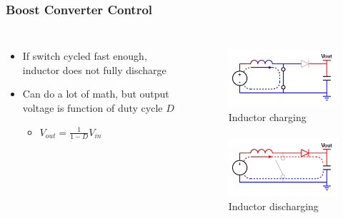 \documentclass{beamer}
\begin{document}
\begin{frame}
\frametitle{Boost Converter Control}
\begin{columns}[t]
\begin{itemize}
  \item If switch cycled fast enough, inductor does not fully discharge
  \item Can do a lot of math, but output voltage is function of duty cycle $D$
  \begin{itemize}
    \item $V_{out}=\frac{1}{1-D} V_{in}$
  \end{itemize}
\end{itemize}

\begin{figure}
  \centering
  \includegraphics[scale=0.33]{images-dis4/smps-boost-closed} \\
  Inductor charging \\
  \hfill \\
  \includegraphics[scale=0.33]{images-dis4/smps-boost-open} \\
  Inductor discharging
\end{figure}
\end{columns}
\end{frame}
\end{document}

